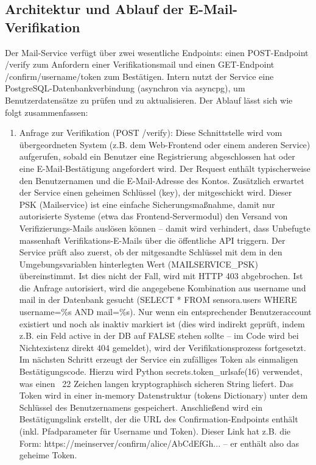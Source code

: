 \subsection{Architektur und Ablauf der E-Mail-Verifikation}
Der Mail-Service verfügt über zwei wesentliche Endpoints: einen POST-Endpoint /verify zum Anfordern einer Verifikationsmail und einen GET-Endpoint /confirm/{username}/{token} zum Bestätigen. Intern nutzt der Service eine PostgreSQL-Datenbankverbindung (asynchron via asyncpg), um Benutzerdatensätze zu prüfen und zu aktualisieren. Der Ablauf lässt sich wie folgt zusammenfassen:
\begin{enumerate}
    \item Anfrage zur Verifikation (POST /verify): Diese Schnittstelle wird vom übergeordneten System (z.B. dem Web-Frontend oder einem anderen Service) aufgerufen, sobald ein Benutzer eine Registrierung abgeschlossen hat oder eine E-Mail-Bestätigung angefordert wird. Der Request enthält typischerweise den Benutzernamen und die E-Mail-Adresse des Kontos. Zusätzlich erwartet der Service einen geheimen Schlüssel (key), der mitgeschickt wird. Dieser PSK (Mailservice) ist eine einfache Sicherungsmaßnahme, damit nur autorisierte Systeme (etwa das Frontend-Servermodul) den Versand von Verifizierungs-Mails auslösen können – damit wird verhindert, dass Unbefugte massenhaft Verifikations-E-Mails über die öffentliche API triggern. Der Service prüft also zuerst, ob der mitgesandte Schlüssel mit dem in den Umgebungsvariablen hinterlegten Wert (MAILSERVICE\_PSK) übereinstimmt. Ist dies nicht der Fall, wird mit HTTP 403 abgebrochen.
    Ist die Anfrage autorisiert, wird die angegebene Kombination aus username und mail in der Datenbank gesucht (SELECT * FROM sensora.users WHERE username=\%s AND mail=\%s). Nur wenn ein entsprechender Benutzeraccount existiert und noch als inaktiv markiert ist (dies wird indirekt geprüft, indem z.B. ein Feld active in der DB auf FALSE stehen sollte – im Code wird bei Nichtexistenz direkt 404 gemeldet), wird der Verifikationsprozess fortgesetzt. Im nächsten Schritt erzeugt der Service ein zufälliges Token als einmaligen Bestätigungscode. Hierzu wird Python secrets.token\_urlsafe(16) verwendet\cite{pythonSecrets}, was einen ~22 Zeichen langen kryptographisch sicheren String liefert. Das Token wird in einer in-memory Datenstruktur (tokens Dictionary) unter dem Schlüssel des Benutzernamens gespeichert. Anschließend wird ein Bestätigungslink erstellt, der die URL des Confirmation-Endpoints enthält (inkl. Pfadparameter für Username und Token). Dieser Link hat z.B. die Form: https://meinserver/confirm/alice/AbCdEfGh... – er enthält also das geheime Token.

\end{enumerate}
